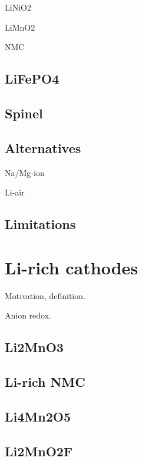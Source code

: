 LiNiO2

LiMnO2

NMC

\subsection{LiFePO4}

\subsection{Spinel}

\subsection{Alternatives}
Na/Mg-ion

Li-air

\subsection{Limitations}

\section{Li-rich cathodes}

Motivation, definition.

Anion redox. \cite{Yahia2019}


\subsection{Li2MnO3}

\subsection{Li-rich NMC}

\subsection{Li4Mn2O5}
\subsection{Li2MnO2F}




